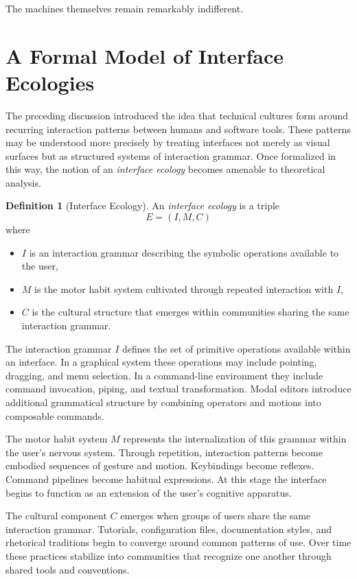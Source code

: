 \documentclass[11pt]{article}
\theoremstyle{definition}
\newtheorem{definition}{Definition}[section]
\begin{document}
The machines themselves remain remarkably indifferent.

\section{A Formal Model of Interface Ecologies}

The preceding discussion introduced the idea that technical cultures
form around recurring interaction patterns between humans and software
tools. These patterns may be understood more precisely by treating
interfaces not merely as visual surfaces but as structured systems of
interaction grammar. Once formalized in this way, the notion of an
\emph{interface ecology} becomes amenable to theoretical analysis.

\begin{definition}[Interface Ecology]
An \emph{interface ecology} is a triple
\[
E = (I, M, C)
\]
where

\begin{itemize}
\item $I$ is an interaction grammar describing the symbolic operations
available to the user,
\item $M$ is the motor habit system cultivated through repeated
interaction with $I$,
\item $C$ is the cultural structure that emerges within communities
sharing the same interaction grammar.
\end{itemize}
\end{definition}

The interaction grammar $I$ defines the set of primitive operations
available within an interface. In a graphical system these operations
may include pointing, dragging, and menu selection. In a command-line
environment they include command invocation, piping, and textual
transformation. Modal editors introduce additional grammatical
structure by combining operators and motions into composable commands.

The motor habit system $M$ represents the internalization of this
grammar within the user's nervous system. Through repetition,
interaction patterns become embodied sequences of gesture and motion.
Keybindings become reflexes. Command pipelines become habitual
expressions. At this stage the interface begins to function as an
extension of the user's cognitive apparatus.

The cultural component $C$ emerges when groups of users share the same
interaction grammar. Tutorials, configuration files, documentation
styles, and rhetorical traditions begin to converge around common
patterns of use. Over time these practices stabilize into communities
that recognize one another through shared tools and conventions.
\end{document}
